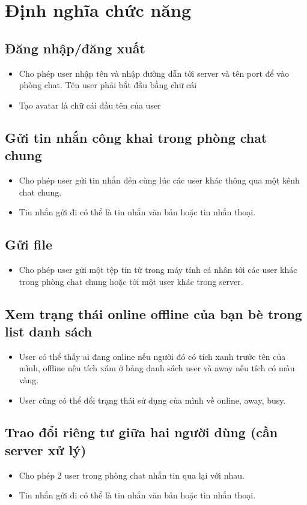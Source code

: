 \documentclass[a4paper]{article}
\begin{document}
\newpage
\tableofcontents
\newpage
\listoffigures
\newpage

\section{Định nghĩa chức năng}
	\subsection{Đăng nhập/đăng xuất}
	\begin{itemize}
		\item Cho phép user nhập tên và nhập đường dẫn tới server và tên port để vào phòng chat. Tên user phải bắt đầu bằng chữ cái
		\item Tạo avatar là chữ cái đầu tên của user
	\end{itemize}
	\subsection{Gửi tin nhắn công khai trong phòng chat chung}
	\begin{itemize}
		\item Cho phép user gửi tin nhắn đến cùng lúc các user khác thông qua một kênh chat chung.
		\item Tin nhắn gửi đi có thể là tin nhắn văn bản hoặc tin nhắn thoại.
	\end{itemize}
	\subsection{Gửi file}
	\begin{itemize}
		\item Cho phép user gửi một tệp tin từ trong máy tính cá nhân tới các user khác trong phòng chat chung hoặc tới một user khác trong server.
	\end{itemize}
	\subsection{Xem trạng thái online offline của bạn bè trong list danh sách}
	\begin{itemize}
		\item User có thể thấy ai đang online nếu người đó có tích xanh trước tên của mình, offline nếu tích xám ở bảng danh sách user và away nếu tích có màu vàng.
		\item User cũng có thể đổi trạng thái sử dụng của mình về online, away, busy.
	\end{itemize}
	\subsection{Trao đổi riêng tư giữa hai người dùng (cần server xử lý)}
	\begin{itemize}
		\item Cho phép 2 user trong phòng chat nhắn tin qua lại với nhau.
		\item Tin nhắn gửi đi có thể là tin nhắn văn bản hoặc tin nhắn thoại.
	\end{itemize}
\end{document}
